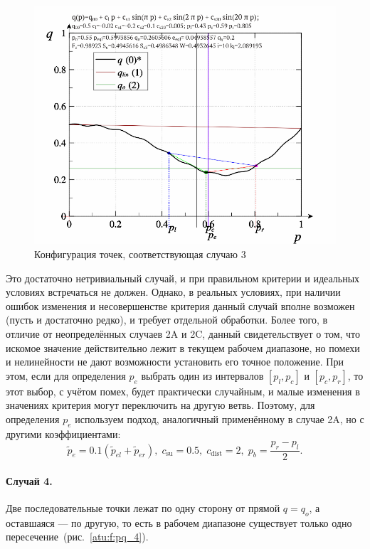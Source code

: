 \begin{figure}[htb!]
  \centerline{\includegraphics[width=60\TW]{p/pq_sin-p_pq_double.png} }
  \caption{Конфигурация точек, соответствующая случаю 3}
  \label{atu:f:pq_3}
\end{figure}

Это достаточно нетривиальный случай,
и при правильном критерии и идеальных условиях
встречаться не должен. Однако, в реальных условиях,
при наличии ошибок изменения и несовершенстве критерия
данный случай вполне возможен (пусть и достаточно редко), и требует отдельной обработки.
Более того, в отличие от неопределённых случаев 2A и 2C,
данный свидетельствует о том, что искомое значение
действительно лежит в текущем рабочем диапазоне,
но помехи и нелинейности не дают возможности установить его
точное положение. При этом, если для определения $p_e$
выбрать один из интервалов $[p_l,p_c]$ и $[p_c, p_r]$,
то этот выбор, с учётом помех, будет практически случайным,
и малые изменения в значениях критерия могут переключить на другую ветвь.
Поэтому, для определения $p_e$ используем подход, аналогичный применённому
в случае 2A, но с другими коэффициентами:
%
\begin{equation}
  \tilde{p}_e = 0.1 ( \tilde{p}_{el} + \tilde{p}_{er} ),
  \;
  c_\mathrm{su} = 0.5, \;  c_\mathrm{dist} = 2, \;   p_b = \frac{p_r - p_l}{2}.
  \label{atu:eq:pr_e_3}
\end{equation}


\paragraph{Случай 4.}
Две последовательные точки лежат по одну сторону от прямой $q=q_o$,
а оставшаяся --- по другую, то есть в рабочем диапазоне
существует только одно пересечение~(рис.~\ref{atu:f:pq_4}).


